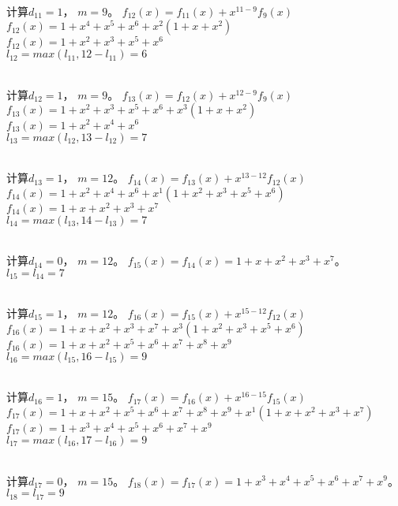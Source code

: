 \documentclass{article}
\begin{document}
~\\
计算$d_{11}={1}$，
$m=9$。
$f_{12}(x) = f_{11}(x) + x^{11-9}f_{9}(x)$\\
$f_{12}(x) = 1 + x^{4} + x^{5} + x^{6}  + x^{2}(1 + x + x^{2} )$\\
$f_{12}(x) = 1 + x^{2} + x^{3} + x^{5} + x^{6} $\\
$l_{12}=max(l_{11}, 12-l_{11})=6$

~\\
计算$d_{12}={1}$，
$m=9$。
$f_{13}(x) = f_{12}(x) + x^{12-9}f_{9}(x)$\\
$f_{13}(x) = 1 + x^{2} + x^{3} + x^{5} + x^{6}  + x^{3}(1 + x + x^{2} )$\\
$f_{13}(x) = 1 + x^{2} + x^{4} + x^{6} $\\
$l_{13}=max(l_{12}, 13-l_{12})=7$

~\\
计算$d_{13}={1}$，
$m=12$。
$f_{14}(x) = f_{13}(x) + x^{13-12}f_{12}(x)$\\
$f_{14}(x) = 1 + x^{2} + x^{4} + x^{6}  + x^{1}(1 + x^{2} + x^{3} + x^{5} + x^{6} )$\\
$f_{14}(x) = 1 + x + x^{2} + x^{3} + x^{7} $\\
$l_{14}=max(l_{13}, 14-l_{13})=7$

~\\
计算$d_{14}={0}$，
$m=12$。
$f_{15}(x) = f_{14}(x) = 1 + x + x^{2} + x^{3} + x^{7} $。
$l_{15}=l_{14} = 7$

~\\
计算$d_{15}={1}$，
$m=12$。
$f_{16}(x) = f_{15}(x) + x^{15-12}f_{12}(x)$\\
$f_{16}(x) = 1 + x + x^{2} + x^{3} + x^{7}  + x^{3}(1 + x^{2} + x^{3} + x^{5} + x^{6} )$\\
$f_{16}(x) = 1 + x + x^{2} + x^{5} + x^{6} + x^{7} + x^{8} + x^{9} $\\
$l_{16}=max(l_{15}, 16-l_{15})=9$

~\\
计算$d_{16}={1}$，
$m=15$。
$f_{17}(x) = f_{16}(x) + x^{16-15}f_{15}(x)$\\
$f_{17}(x) = 1 + x + x^{2} + x^{5} + x^{6} + x^{7} + x^{8} + x^{9}  + x^{1}(1 + x + x^{2} + x^{3} + x^{7} )$\\
$f_{17}(x) = 1 + x^{3} + x^{4} + x^{5} + x^{6} + x^{7} + x^{9} $\\
$l_{17}=max(l_{16}, 17-l_{16})=9$

~\\
计算$d_{17}={0}$，
$m=15$。
$f_{18}(x) = f_{17}(x) = 1 + x^{3} + x^{4} + x^{5} + x^{6} + x^{7} + x^{9} $。
$l_{18}=l_{17} = 9$
\end{document}
